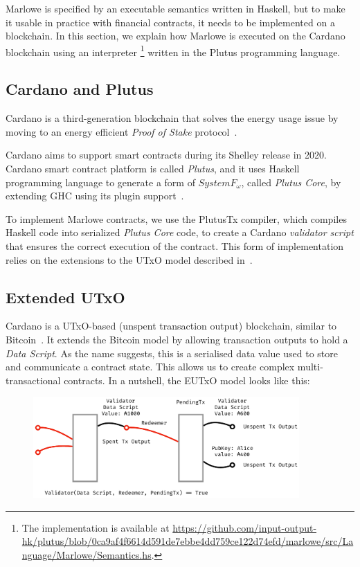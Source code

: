 \documentclass[runningheads]{llncs}
\begin{document}
Marlowe is specified by an executable semantics written in Haskell, but to make it usable in practice with financial contracts, it needs to be implemented on a blockchain. In this section, we explain how Marlowe is executed on the Cardano blockchain using an interpreter \footnote{The implementation is available at \url{https://github.com/input-output-hk/plutus/blob/0ca9af4f6614d591de7ebbe4dd759ce122d74efd/marlowe/src/Language/Marlowe/Semantics.hs}.} written in the Plutus programming language.

\subsection{Cardano and Plutus}

Cardano is a third-generation blockchain that solves the energy usage
issue by moving to an energy efficient \emph{Proof of Stake} protocol~\cite{Ouroboros-Genesis}.

Cardano aims to support smart contracts during its Shelley release in 2020.
Cardano smart contract platform is called \emph{Plutus}, and
it uses Haskell programming language to generate a form of $System F_{\omega}$,
called \emph{Plutus Core}, by extending GHC using its plugin
support~\cite[Section 13.3]{ghcusersguide}.

To implement Marlowe contracts, we use the PlutusTx compiler,
which compiles Haskell code into serialized \emph{Plutus Core} code,
to create a Cardano \emph{validator script} that ensures the correct execution of the contract.
This form of implementation relies on the extensions to the UTxO model described in~\cite{PlutusPlatform}.


\subsection{Extended UTxO}

Cardano is a UTxO-based (unspent transaction output) blockchain, similar to Bitcoin~\cite{sok}.
It extends the Bitcoin model by allowing transaction outputs to hold a \emph{Data Script}.
As the name suggests, this is  a serialised data value used to store and communicate a contract state.
This allows us to create complex multi-transactional contracts.
In a nutshell, the EUTxO model looks like this:

\begin{figure}[!h]
    \centering
    \includegraphics[width=4in]{figures/Marlowe3-Figure-1-crop.pdf}
\end{figure}
\end{document}
